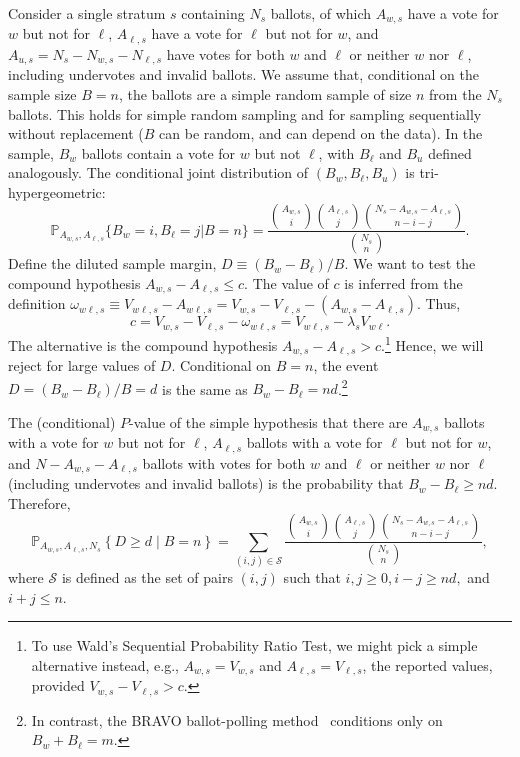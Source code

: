 \documentclass[runningheads]{llncs}
\newcommand{\beq}{\begin{equation}}
\newcommand{\eeq}{\end{equation}}
\begin{document}
Consider a single stratum $s$ containing $N_s$ ballots, of which $A_{w,s}$ have a vote for $w$ but not for $\ell$, $A_{\ell,s}$ have a vote for $\ell$ but not for $w$, and $A_{u,s} = N_s - N_{w,s} - N_{\ell,s}$ have votes for both $w$ and $\ell$ or neither $w$ nor $\ell$, including undervotes and invalid ballots.
We assume that, conditional on the sample size $B=n$, the ballots are a simple random sample of size $n$ from the $N_s$ ballots.
This holds for simple random sampling and for sampling 
sequentially without replacement ($B$ can be random, and can depend on the
data).
In the sample, $B_w$ ballots contain a vote for $w$ but not $\ell$, with $B_\ell$ and $B_u$ 
defined analogously.
The conditional joint distribution of
$(B_w, B_\ell, B_u)$ is tri-hypergeometric: 
\beq
    \mathbb{P}_{A_{w,s}, A_{\ell,s}} \{ B_w = i, B_\ell = j \vert B=n \} = 
     \frac{ {A_{w,s } \choose i}{A_{\ell,s} \choose j}{N_s - A_{w,s} - A_{\ell,s} \choose n-i-j}}{{N_s \choose n}}.
\eeq
Define the diluted sample margin, $D \equiv (B_w - B_\ell)/B$.
We want to test the compound hypothesis $A_{w,s} - A_{\ell,s} \le c$.
The value of $c$ is inferred from the definition
$\omega_{w\ell,s} \equiv V_{w\ell,s} - A_{w\ell,s} = V_{w,s} - V_{\ell,s} - (A_{w,s} -A_{\ell,s})$.
Thus,
\beq
    c = V_{w,s} - V_{\ell,s} - \omega_{w\ell,s} = V_{w\ell,s} - \lambda_s V_{w\ell}.
\eeq
The alternative is the compound hypothesis 
$A_{w,s} - A_{\ell,s} > c$.\footnote{%
    To use Wald's Sequential Probability Ratio Test, we might pick a simple alternative instead, e.g.,
   $A_{w,s} = V_{w,s}$ and $A_{\ell,s} = V_{\ell,s}$, the reported values, provided 
   $V_{w,s} - V_{\ell,s} > c$.
}
Hence, we will reject for large values of $D$.
Conditional on $B=n$, the event $D = (B_w - B_\ell)/B = d$ is the same as $B_w - B_\ell = nd$.\footnote{%
In contrast, the BRAVO ballot-polling
method~\cite{lindemanEtal12}
conditions only on $B_w+B_\ell = m$.
}

The (conditional) $P$-value of the simple hypothesis that there are $A_{w,s}$ ballots with
a vote for $w$ but not for $\ell$, $A_{\ell,s}$ ballots with a vote for $\ell$ but not for $w$, 
and $N - A_{w,s} - A_{\ell,s}$ ballots with votes for both $w$ and $\ell$ or neither $w$ nor $\ell$ 
(including undervotes and
invalid ballots) is the probability that $B_w - B_\ell \geq nd$.
Therefore,
\begin{equation}
   \mathbb{P}_{A_{w,s}, A_{\ell,s}, N_s} \left \{ D \geq d \;\vert\; B = n\right \} = 
   \sum_{(i, j) \in \mathcal{S}} \frac{ {A_{w,s } \choose i}{A_{\ell,s} \choose j}{N_s - A_{w,s} - A_{\ell,s} \choose n-i-j}}{{N_s \choose n}},
\end{equation}
where $\mathcal{S}$ is defined as the set of pairs $(i, j)$ such that $i, j\ge 0, i-j \ge nd,$ and $ i+j \leq n$.
\end{document}
